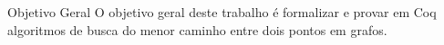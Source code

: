 \begin{frame}{Objetivo Geral}
    O objetivo geral deste trabalho é formalizar e provar em Coq algoritmos de busca do menor caminho entre dois pontos em grafos.
\end{frame}
